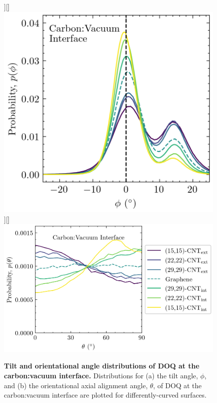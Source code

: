 \documentclass[journal=jpcbfk, layout=twocolumn, manuscript=article]{achemso}
\begin{document}
\begin{figure}[!htbp]
    \centering
    \subfloat[]][]{\includegraphics[height=.2\textheight]{Figures/phi_distn_vacuum/DOQ_8_phi_distn.png}}
    \subfloat[]][]{\includegraphics[height=.2\textheight]{Figures/theta_distn_vacuum/DOQ_8_theta_distn_symmetry.png}}
    \caption{\textbf{Tilt and orientational angle distributions of DOQ at the carbon:vacuum interface.} Distributions for (a) the tilt angle, $\phi$, and (b) the orientational axial alignment angle, $\theta$, of DOQ at the carbon:vacuum interface are plotted for differently-curved surfaces.}
    \label{fig:Conf_DOQ_orientational}
\end{figure}
\end{document}
